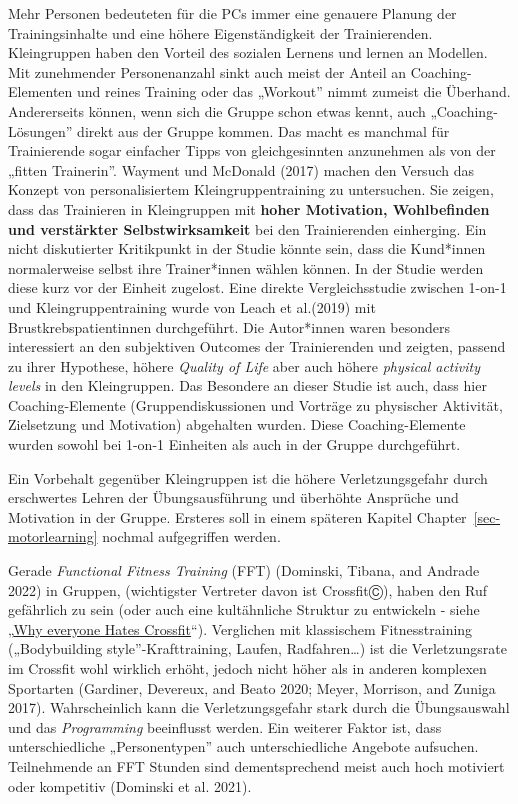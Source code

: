 \documentclass[
  letterpaper,
  DIV=11,
  numbers=noendperiod]{scrreprt}
\begin{document}
Mehr Personen bedeuteten für die PCs immer eine genauere Planung der
Trainingsinhalte und eine höhere Eigenständigkeit der Trainierenden.
Kleingruppen haben den Vorteil des sozialen Lernens und lernen an
Modellen. Mit zunehmender Personenanzahl sinkt auch meist der Anteil an
Coaching-Elementen und reines Training oder das „Workout'' nimmt zumeist
die Überhand. Andererseits können, wenn sich die Gruppe schon etwas
kennt, auch „Coaching-Lösungen'' direkt aus der Gruppe kommen. Das macht
es manchmal für Trainierende sogar einfacher Tipps von gleichgesinnten
anzunehmen als von der „fitten Trainerin''. Wayment und McDonald (2017)
machen den Versuch das Konzept von personalisiertem Kleingruppentraining
zu untersuchen. Sie zeigen, dass das Trainieren in Kleingruppen mit
\textbf{hoher Motivation, Wohlbefinden und verstärkter
Selbstwirksamkeit} bei den Trainierenden einherging. Ein nicht
diskutierter Kritikpunkt in der Studie könnte sein, dass die Kund*innen
normalerweise selbst ihre Trainer*innen wählen können. In der Studie
werden diese kurz vor der Einheit zugelost. Eine direkte
Vergleichsstudie zwischen 1-on-1 und Kleingruppentraining wurde von
Leach et al.(2019) mit Brustkrebspatientinnen durchgeführt. Die
Autor*innen waren besonders interessiert an den subjektiven Outcomes der
Trainierenden und zeigten, passend zu ihrer Hypothese, höhere
\emph{Quality of Life} aber auch höhere \emph{physical activity levels}
in den Kleingruppen. Das Besondere an dieser Studie ist auch, dass hier
Coaching-Elemente (Gruppendiskussionen und Vorträge zu physischer
Aktivität, Zielsetzung und Motivation) abgehalten wurden. Diese
Coaching-Elemente wurden sowohl bei 1-on-1 Einheiten als auch in der
Gruppe durchgeführt.

Ein Vorbehalt gegenüber Kleingruppen ist die höhere Verletzungsgefahr
durch erschwertes Lehren der Übungsausführung und überhöhte Ansprüche
und Motivation in der Gruppe. Ersteres soll in einem späteren Kapitel
Chapter~\ref{sec-motorlearning} nochmal aufgegriffen werden.

Gerade \emph{Functional Fitness Training} (FFT) (Dominski, Tibana, and
Andrade 2022) in Gruppen, (wichtigster Vertreter davon ist CrossfitⒸ),
haben den Ruf gefährlich zu sein (oder auch eine kultähnliche Struktur
zu entwickeln - siehe
„\href{https://www.youtube.com/watch?v=2XNcEFPXif0}{Why everyone Hates
Crossfit}``). Verglichen mit klassischem Fitnesstraining („Bodybuilding
style''-Krafttraining, Laufen, Radfahren\ldots) ist die Verletzungsrate
im Crossfit wohl wirklich erhöht, jedoch nicht höher als in anderen
komplexen Sportarten (Gardiner, Devereux, and Beato 2020; Meyer,
Morrison, and Zuniga 2017). Wahrscheinlich kann die Verletzungsgefahr
stark durch die Übungsauswahl und das \emph{Programming} beeinflusst
werden. Ein weiterer Faktor ist, dass unterschiedliche „Personentypen''
auch unterschiedliche Angebote aufsuchen. Teilnehmende an FFT Stunden
sind dementsprechend meist auch hoch motiviert oder kompetitiv (Dominski
et al. 2021).
\end{document}
